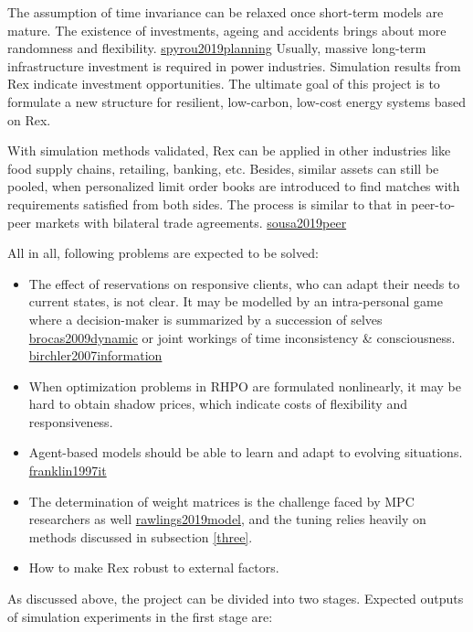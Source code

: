 \documentclass[letterpaper,8pt,twocolumn,twoside,]{pinp}
\providecommand{\tightlist}{%
  \setlength{\itemsep}{0pt}\setlength{\parskip}{0pt}}
\begin{document}
The assumption of time invariance can be relaxed once short-term models
are mature. The existence of investments, ageing and accidents brings
about more randomness and flexibility.
\protect\hyperlink{reference}{spyrou2019planning} Usually, massive
long-term infrastructure investment is required in power industries.
Simulation results from Rex indicate investment opportunities. The
ultimate goal of this project is to formulate a new structure for
resilient, low-carbon, low-cost energy systems based on Rex.

With simulation methods validated, Rex can be applied in other
industries like food supply chains, retailing, banking, etc. Besides,
similar assets can still be pooled, when personalized limit order books
are introduced to find matches with requirements satisfied from both
sides. The process is similar to that in peer-to-peer markets with
bilateral trade agreements. \protect\hyperlink{reference}{sousa2019peer}

All in all, following problems are expected to be solved:

\begin{itemize}
\tightlist
\item
  The effect of reservations on responsive clients, who can adapt their
  needs to current states, is not clear. It may be modelled by an
  intra-personal game where a decision-maker is summarized by a
  succession of selves \protect\hyperlink{reference}{brocas2009dynamic}
  or joint workings of time inconsistency \& consciousness.
  \protect\hyperlink{reference}{birchler2007information}
\item
  When optimization problems in RHPO are formulated nonlinearly, it may
  be hard to obtain shadow prices, which indicate costs of flexibility
  and responsiveness.
\item
  Agent-based models should be able to learn and adapt to evolving
  situations. \protect\hyperlink{reference}{franklin1997it}
\item
  The determination of weight matrices is the challenge faced by MPC
  researchers as well \protect\hyperlink{reference}{rawlings2019model},
  and the tuning relies heavily on methods discussed in subsection
  \ref{three}.
\item
  How to make Rex robust to external factors.
\end{itemize}

As discussed above, the project can be divided into two stages. Expected
outputs of simulation experiments in the first stage are:
\end{document}
